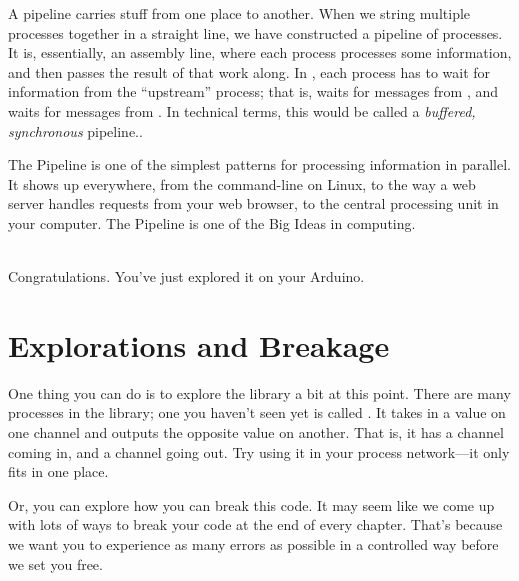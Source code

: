 \newpage


A pipeline carries stuff from one place to another. When we string multiple processes together in a straight line, we have constructed a {\strong pipeline} of processes. It is, essentially, an assembly line, where each process processes some information, and then passes the result of that work along. In \plumbing, each process has to wait for information from the ``upstream'' process; that is, \pinlevel waits for messages from \toggle, and \toggle waits for messages from \bp. In technical terms, this would be called a {\em buffered, synchronous} pipeline.. 

The Pipeline is one of the simplest patterns for processing information in parallel. It shows up everywhere, from the command-line on Linux, to the way a web server handles requests from your web browser, to the central processing unit in your computer. The Pipeline is one of the Big Ideas in computing.

\ \\

Congratulations. You've just explored it on your Arduino.

\newpage

\section{Explorations and Breakage}
One thing you can do is to explore the \plumbing library a bit at this point. There are many processes in the \plumbing library; one you haven't seen yet is called \il. It takes in a \LEVELT value on one channel and outputs the opposite value on another. That is, it has a \LEVELT channel coming in, and a \LEVELT channel going out. Try using it in your process network---it only fits in one place.

Or, you can explore how you can break this code. It may seem like we come up with lots of ways to break your code at the end of every chapter. That's because we want you to experience as many errors as possible in a controlled way before we set you free.

